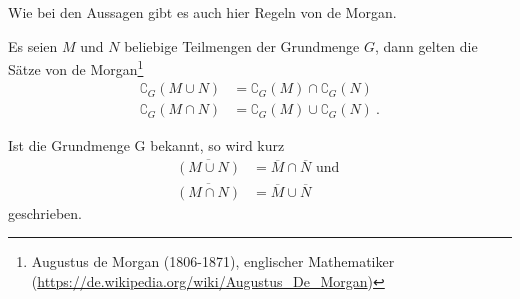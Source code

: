 \begin{Unit}
Wie bei den Aussagen gibt es auch hier Regeln von de Morgan.

\begin{Satz}
  Es seien $M$ und $N$ beliebige Teilmengen der Grundmenge $G$, dann gelten 
  die Sätze von de Morgan\footnote{Augustus 
  de Morgan (1806-1871), englischer Mathematiker
(\url{https://de.wikipedia.org/wiki/Augustus_De_Morgan})} 
  \begin{align}
    \complement_G(M \cup N) &= \complement_G(M) \cap \complement_G(N) \\
    \complement_G(M \cap N) &= \complement_G(M) \cup \complement_G(N) \ .
  \end{align}
\end{Satz}

Ist die Grundmenge G bekannt, so wird kurz
\begin{align}
  \overline{(M \cup N)} &= \overline{M} \cap \overline{N} \text{ und } \\
  \overline{(M \cap N)} &= \overline{M} \cup \overline{N} 
\end{align}
geschrieben.


\end{Unit}
